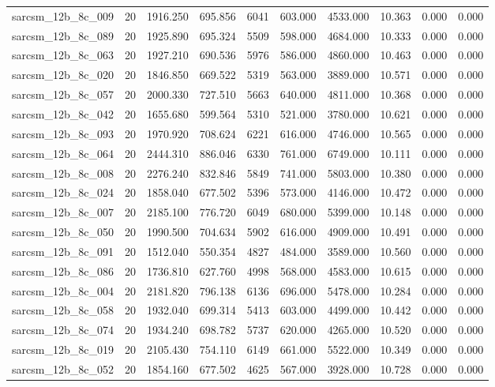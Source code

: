 \begin{tabular}{lrrrrrrrrr}
sarcsm\_12b\_8c\_009 & 20 & 1916.250 & 695.856 & 6041 & 603.000 & 4533.000 & 10.363 & 0.000 & 0.000 \\
sarcsm\_12b\_8c\_089 & 20 & 1925.890 & 695.324 & 5509 & 598.000 & 4684.000 & 10.333 & 0.000 & 0.000 \\
sarcsm\_12b\_8c\_063 & 20 & 1927.210 & 690.536 & 5976 & 586.000 & 4860.000 & 10.463 & 0.000 & 0.000 \\
sarcsm\_12b\_8c\_020 & 20 & 1846.850 & 669.522 & 5319 & 563.000 & 3889.000 & 10.571 & 0.000 & 0.000 \\
sarcsm\_12b\_8c\_057 & 20 & 2000.330 & 727.510 & 5663 & 640.000 & 4811.000 & 10.368 & 0.000 & 0.000 \\
sarcsm\_12b\_8c\_042 & 20 & 1655.680 & 599.564 & 5310 & 521.000 & 3780.000 & 10.621 & 0.000 & 0.000 \\
sarcsm\_12b\_8c\_093 & 20 & 1970.920 & 708.624 & 6221 & 616.000 & 4746.000 & 10.565 & 0.000 & 0.000 \\
sarcsm\_12b\_8c\_064 & 20 & 2444.310 & 886.046 & 6330 & 761.000 & 6749.000 & 10.111 & 0.000 & 0.000 \\
sarcsm\_12b\_8c\_008 & 20 & 2276.240 & 832.846 & 5849 & 741.000 & 5803.000 & 10.380 & 0.000 & 0.000 \\
sarcsm\_12b\_8c\_024 & 20 & 1858.040 & 677.502 & 5396 & 573.000 & 4146.000 & 10.472 & 0.000 & 0.000 \\
sarcsm\_12b\_8c\_007 & 20 & 2185.100 & 776.720 & 6049 & 680.000 & 5399.000 & 10.148 & 0.000 & 0.000 \\
sarcsm\_12b\_8c\_050 & 20 & 1990.500 & 704.634 & 5902 & 616.000 & 4909.000 & 10.491 & 0.000 & 0.000 \\
sarcsm\_12b\_8c\_091 & 20 & 1512.040 & 550.354 & 4827 & 484.000 & 3589.000 & 10.560 & 0.000 & 0.000 \\
sarcsm\_12b\_8c\_086 & 20 & 1736.810 & 627.760 & 4998 & 568.000 & 4583.000 & 10.615 & 0.000 & 0.000 \\
sarcsm\_12b\_8c\_004 & 20 & 2181.820 & 796.138 & 6136 & 696.000 & 5478.000 & 10.284 & 0.000 & 0.000 \\
sarcsm\_12b\_8c\_058 & 20 & 1932.040 & 699.314 & 5413 & 603.000 & 4499.000 & 10.442 & 0.000 & 0.000 \\
sarcsm\_12b\_8c\_074 & 20 & 1934.240 & 698.782 & 5737 & 620.000 & 4265.000 & 10.520 & 0.000 & 0.000 \\
sarcsm\_12b\_8c\_019 & 20 & 2105.430 & 754.110 & 6149 & 661.000 & 5522.000 & 10.349 & 0.000 & 0.000 \\
sarcsm\_12b\_8c\_052 & 20 & 1854.160 & 677.502 & 4625 & 567.000 & 3928.000 & 10.728 & 0.000 & 0.000 \\

\end{tabular}

